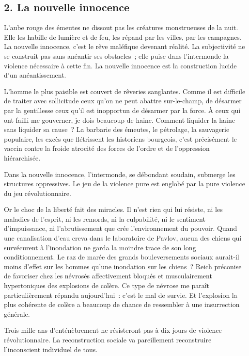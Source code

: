 \documentclass[french,twoside]{book} %
\begin{document}
\subsection[{2. La nouvelle innocence}]{\textsc{2.} La nouvelle innocence}
\noindent L’aube rouge des émeutes ne dissout pas les créatures monstrueuses de la nuit. Elle les habille de lumière et de feu, les répand par les villes, par les campagnes. La nouvelle innocence, c’est le rêve maléfique devenant réalité. La subjectivité ne se construit pas sans anéantir ses obstacles ; elle puise dans l’intermonde la violence nécessaire à cette fin. La nouvelle innocence est la construction lucide d’un anéantissement.\par
L’homme le plus paisible est couvert de rêveries sanglantes. Comme il est difficile de traiter avec sollicitude ceux qu’on ne peut abattre sur-le-champ, de désarmer par la gentillesse ceux qu’il est inopportun de désarmer par la force. À ceux qui ont failli me gouverner, je dois beaucoup de haine. Comment liquider la haine sans liquider sa cause ? La barbarie des émeutes, le pétrolage, la sauvagerie populaire, les excès que flétrissent les historiens bourgeois, c’est précisément le vaccin contre la froide atrocité des forces de l’ordre et de l’oppression hiérarchisée.\par
Dans la nouvelle innocence, l’intermonde, se débondant soudain, submerge les structures oppressives. Le jeu de la violence pure est englobé par la pure violence du jeu révolutionnaire.\par
Or le choc de la liberté fait des miracles. Il n’est rien qui lui résiste, ni les maladies de l’esprit, ni les remords, ni la culpabilité, ni le sentiment d’impuissance, ni l’abrutissement que crée l’environnement du pouvoir. Quand une canalisation d’eau creva dans le laboratoire de Pavlov, aucun des chiens qui survécurent à l’inondation ne garda la moindre trace de son long conditionnement. Le raz de marée des grands bouleversements sociaux aurait-il moins d’effet sur les hommes qu’une inondation sur les chiens ? Reich préconise de favoriser chez les névrosés affectivement bloqués et musculairement hypertoniques des explosions de colère. Ce type de névrose me paraît particulièrement répandu aujourd’hui : c’est le mal de survie. Et l’explosion la plus cohérente de colère a beaucoup de chance de ressembler à une insurrection générale.\par
Trois mille ans d’enténèbrement ne résisteront pas à dix jours de violence révolutionnaire. La reconstruction sociale va pareillement reconstruire l’inconscient individuel de tous.\par
\end{document}
